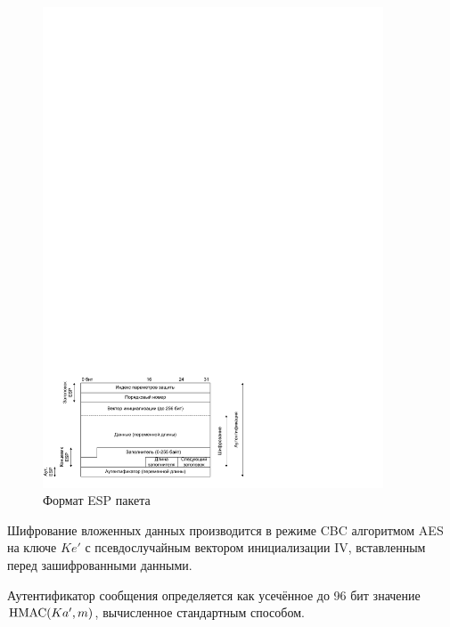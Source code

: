 \begin{figure}[!ht]
	\centering
	\includegraphics[width=0.9\textwidth]{pic/ipsec-esp}
	\caption{Формат ESP пакета\label{fig:ipsec-esp}}
\end{figure}

Шифрование вложенных данных производится в режиме CBC алгоритмом AES на ключе $Ke'$ с псевдослучайным вектором инициализации IV, вставленным перед зашифрованными данными.

Аутентификатор сообщения определяется как усечённое до 96 бит значение $\textrm{HMAC}(Ka', m)$, вычисленное стандартным способом.

